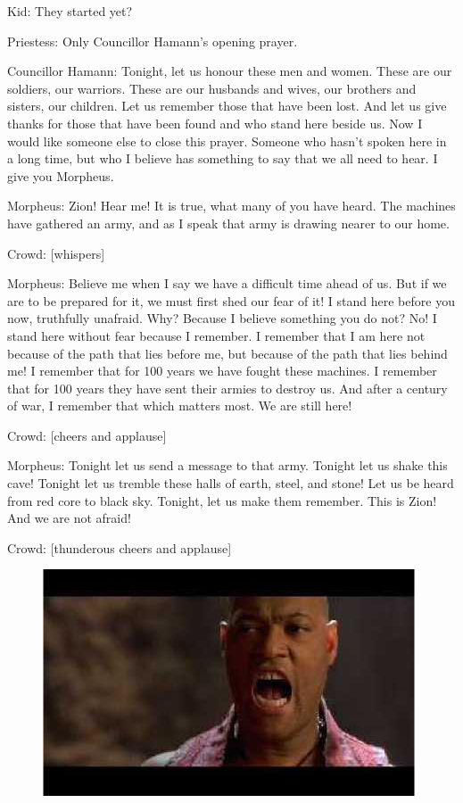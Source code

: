 \documentclass{ctexart}
\newenvironment{myquote}{\color{green} \setlength{\leftskip}{6em} \setlength{\rightskip}{4em} \setlength{\parindent}{-2em}}{\par}
\begin{document}
\begin{myquote}
Kid: They started yet?

Priestess: Only Councillor Hamann's opening prayer.

Councillor Hamann: Tonight, let us honour these men and women. These are our soldiers, our warriors. These are our husbands and wives, our brothers and sisters, our children. Let us remember those that have been lost. And let us give thanks for those that have been found and who stand here beside us. Now I would like someone else to close this prayer. Someone who hasn't spoken here in a long time, but who I believe has something to say that we all need to hear. I give you Morpheus.

Morpheus: Zion! Hear me! It is true, what many of you have heard. The machines have gathered an army, and as I speak that army is drawing nearer to our home.

Crowd: [whispers]

Morpheus: Believe me when I say we have a difficult time ahead of us. But if we are to be prepared for it, we must first shed our fear of it! I stand here before you now, truthfully unafraid. Why? Because I believe something you do not? No! I stand here without fear because I remember. I remember that I am here not because of the path that lies before me, but because of the path that lies behind me! I remember that for 100 years we have fought these machines. I remember that for 100 years they have sent their armies to destroy us. And after a century of war, I remember that which matters most. We are still here!

Crowd: [cheers and applause]

Morpheus: Tonight let us send a message to that army. Tonight let us shake this cave! Tonight let us tremble these halls of earth, steel, and stone! Let us be heard from red core to black sky. Tonight, let us make them remember. This is Zion! And we are not afraid!

Crowd: [thunderous cheers and applause]
\end{myquote}

\begin{figure}[htb]
\centering
\includegraphics[width=0.5\linewidth]{fig/read_reloaded-41}
\end{figure}
\end{document}

